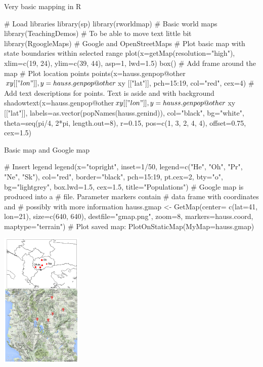 \documentclass[compress, ucs, xelatex, 11pt, xcolor=svgnames,
  hyperref={
    bookmarks=true,
    unicode=true,
    colorlinks=true,
    pdftitle={Molecular data in R},
    plainpages=false,
    pdfauthor={Vojtech Zeisek},
    pdfsubject={Course about phylogeny and evolution in R},
    pdfcreator={XeLaTeX},
    pdfkeywords={R, evolution, phylogeny, molecular data},
    linkcolor=Tomato,
    anchorcolor=SaddleBrown,
    citecolor=Goldenrod,
    filecolor=DarkMagenta,
    menucolor=Sienna,
    urlcolor=DarkTurquoise,
    pdftex},
  url={hyphens, lowtilde} %
  ]{beamer}
\begin{document}
\begin{frame}[fragile]{Very basic mapping in R}
  \begin{spluscode}
    # Load libraries
    library(sp)
    library(rworldmap) # Basic world maps
    library(TeachingDemos) # To be able to move text little bit
    library(RgoogleMaps) # Google and OpenStreetMaps
    # Plot basic map with state boundaries within selected range
    plot(x=getMap(resolution="high"), xlim=c(19, 24), ylim=c(39, 44),
      asp=1, lwd=1.5)
    box() # Add frame around the map
    # Plot location points
    points(x=hauss.genpop@other$xy[["lon"]], y=hauss.genpop@other$xy
      [["lat"]], pch=15:19, col="red", cex=4)
    # Add text descriptions for points. Text is aside and with background
    shadowtext(x=hauss.genpop@other$xy[["lon"]], y=hauss.genpop@other$xy
      [["lat"]], labels=as.vector(popNames(hauss.genind)), col="black",
      bg="white", theta=seq(pi/4, 2*pi, length.out=8), r=0.15,
      pos=c(1, 3, 2, 4, 4), offset=0.75, cex=1.5)
  \end{spluscode}
\end{frame}

\begin{frame}[fragile]{Basic map and Google map}
\begin{multicols}{2}
  \begin{spluscode}
    # Insert legend
    legend(x="topright", inset=1/50,
      legend=c("He", "Oh", "Pr", "Ne",
      "Sk"), col="red", border="black",
      pch=15:19, pt.cex=2, bty="o",
      bg="lightgrey", box.lwd=1.5,
      cex=1.5, title="Populations")
    # Google map is produced into a
    # file. Parameter markers contain
    # data frame with coordinates and
    # possibly with more information
    hauss.gmap <- GetMap(center=
      c(lat=41, lon=21), size=c(640,
      640), destfile="gmap.png",
      zoom=8, markers=hauss.coord,
      maptype="terrain") # Plot saved map:
    PlotOnStaticMap(MyMap=hauss.gmap)
  \end{spluscode}
  \begin{center}
    \includegraphics[height=6.5cm]{maps.png}
  \end{center}
\end{multicols}
\end{frame}
\end{document}
